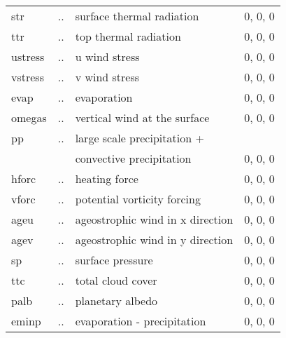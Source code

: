 \begin{tabular}{llll}
str	&    ..	           &	surface thermal radiation	&	0, 0, 0    \\
ttr	&    ..	           &	top thermal radiation	        &	0, 0, 0    \\
ustress	&    ..	           &	u wind stress			&	0, 0, 0    \\
vstress	&    ..	           &	v wind stress			&	0, 0, 0    \\
evap	&    ..	           &	evaporation			&	0, 0, 0    \\
omegas	&    ..            &    vertical wind at the surface	&	0, 0, 0    \\
pp	&    ..            &	large scale precipitation +     &                  \\
	&	           &	convective precipitation	&	0, 0, 0    \\
hforc   &    ..   	   &    heating force			&       0, 0, 0    \\
vforc   &    ..            &    potential vorticity forcing	&       0, 0, 0    \\
ageu	&    ..	           &	ageostrophic wind in x direction&	0, 0, 0    \\	    
agev	&    ..	           &	ageostrophic wind in y direction&	0, 0, 0    \\
sp  	&    ..	           &	surface pressure                &	0, 0, 0    \\
ttc  	&    ..	           &	total cloud cover               &	0, 0, 0    \\
palb  	&    ..	           &	planetary albedo                &	0, 0, 0    \\
eminp	&    ..	           &	evaporation - precipitation	&	0, 0, 0    \\  \hline   
\hline
\end{tabular}

\newpage

